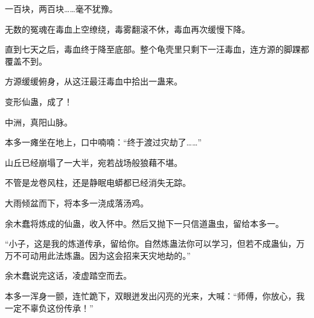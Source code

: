 \begin{this_body}
一百块，两百块……毫不犹豫。

无数的冤魂在毒血上空缭绕，毒雾翻滚不休，毒血再次缓慢下降。

直到七天之后，毒血终于降至底部。整个龟壳里只剩下一汪毒血，连方源的脚踝都覆盖不到。

方源缓缓俯身，从这汪最汪毒血中拾出一蛊来。

变形仙蛊，成了！

中洲，真阳山脉。

本多一瘫坐在地上，口中喃喃：“终于渡过灾劫了……”

山丘已经崩塌了一大半，宛若战场般狼藉不堪。

不管是龙卷风柱，还是静眠电蟒都已经消失无踪。

大雨倾盆而下，将本多一浇成落汤鸡。

余木蠢将炼成的仙蛊，收入怀中。然后又抛下一只信道蛊虫，留给本多一。

“小子，这是我的炼道传承，留给你。自然炼蛊法你可以学习，但若不成蛊仙，万万不可动用此法炼蛊。因为这会招来天灾地劫的。”

余木蠢说完这话，凌虚踏空而去。

本多一浑身一颤，连忙跪下，双眼迸发出闪亮的光来，大喊：“师傅，你放心，我一定不辜负这份传承！”

\end{this_body}

